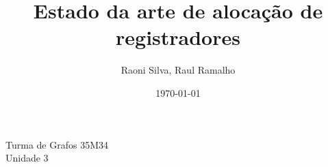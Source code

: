 \documentclass[a4paper,12pt]{article}
\title{Estado da arte de alocação de registradores}
\author{Raoni Silva, Raul Ramalho}
\date{\today}
\begin{document}
\maketitle

\noindent Turma de Grafos 35M34 \\ Unidade 3

\newpage

\tableofcontents












\end{document}
